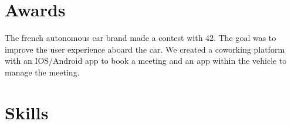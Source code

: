 \documentclass[a4paper]{deedy-resume} %
\begin{document}
\sectionspace %


\section{Awards}




\sectionspace %



\begin{description}
\item The french autonomous car brand made a contest with 42. The goal was to improve the
user experience aboard the car. We created a coworking platform with an IOS/Android 
app to book a meeting and an app within the vehicle to manage the meeting.
\end{description}
\sectionspace %

\sectionspace %


\section{Skills}
\end{document}
